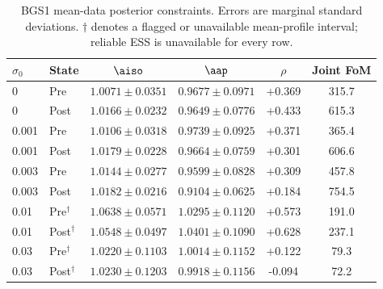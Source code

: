 \begin{table}[t]
\caption{\label{tab:baseline_BGS1}BGS1 mean-data posterior constraints. Errors are marginal standard deviations. $\dagger$ denotes a flagged or unavailable mean-profile interval; reliable ESS is unavailable for every row.}
\begin{ruledtabular}
\begin{tabular}{llcccc}
$\sigma_0$ & State & $\aiso$ & $\aap$ & $\rho$ & Joint FoM \\
\hline
0 & Pre & $1.0071\pm0.0351$ & $0.9677\pm0.0971$ & +0.369 & 315.7 \\
0 & Post & $1.0166\pm0.0232$ & $0.9649\pm0.0776$ & +0.433 & 615.3 \\
0.001 & Pre & $1.0106\pm0.0318$ & $0.9739\pm0.0925$ & +0.371 & 365.4 \\
0.001 & Post & $1.0179\pm0.0228$ & $0.9664\pm0.0759$ & +0.301 & 606.6 \\
0.003 & Pre & $1.0144\pm0.0277$ & $0.9599\pm0.0828$ & +0.309 & 457.8 \\
0.003 & Post & $1.0182\pm0.0216$ & $0.9104\pm0.0625$ & +0.184 & 754.5 \\
0.01 & Pre$^{\dagger}$ & $1.0638\pm0.0571$ & $1.0295\pm0.1120$ & +0.573 & 191.0 \\
0.01 & Post$^{\dagger}$ & $1.0548\pm0.0497$ & $1.0401\pm0.1090$ & +0.628 & 237.1 \\
0.03 & Pre$^{\dagger}$ & $1.0220\pm0.1103$ & $1.0014\pm0.1152$ & +0.122 & 79.3 \\
0.03 & Post$^{\dagger}$ & $1.0230\pm0.1203$ & $0.9918\pm0.1156$ & -0.094 & 72.2 \\
\end{tabular}
\end{ruledtabular}
\end{table}
